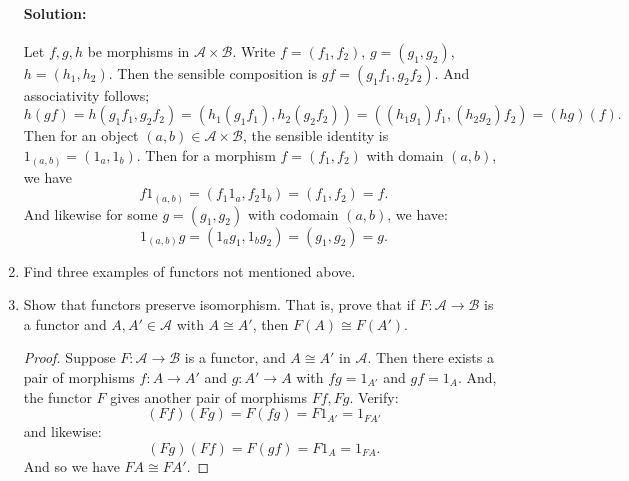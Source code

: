 \documentclass{article}
\begin{document}
\begin{enumerate}
         \paragraph{Solution: }Let $f,g,h$ be morphisms in $\mathscr{A}\times \mathscr{B}$.
         Write $f=(f_1,f_2)$, $g=(g_1,g_2)$, $h=(h_1,h_2)$. Then the sensible composition is $gf=(g_1f_1,g_2f_2)$. And associativity follows; 
         \[
         h(gf)=h(g_1f_1,g_2f_2)=(h_1(g_1f_1),h_2(g_2f_2))=((h_1g_1)f_1,(h_2g_2)f_2)=(hg)(f)
         .\] 
         Then for an object $(a,b)\in \mathscr{A}\times \mathscr{B}$, the sensible identity is $1_{(a,b)}=(1_a,1_b)$. Then for a morphism $f=(f_1,f_2)$ with domain $(a,b)$, we have 
         \[
         f1_{(a,b)}=(f_1 1_a, f_2 1_b)=(f_1,f_2)=f
         .\] 
         And likewise for some $g=(g_1,g_2)$ with codomain $(a,b)$, we have:
          \[
         1_{(a,b)}g=(1_ag_1,1_bg_2)=(g_1,g_2)=g
         .\] 
    \item Find three examples of functors not mentioned above.

    \item Show that functors preserve isomorphism. That is, prove that if $F:\mathscr{A}\to \mathscr{B}$ is a functor and $A,A'\in \mathscr{A}$ with $A\cong A'$, then $F(A)\cong F(A')$.
        \begin{proof} 
            Suppose $F:\mathscr{A}\to \mathscr{B} $ is a functor, and $A\cong A'$ in $\mathscr{A}.$ Then there exists a pair of morphisms $f:A\to A'$ and $g:A'\to A$ with $fg=1_{A'}$ and $gf=1_A$. And, the functor $F$ gives another pair of morphisms $Ff,Fg$. Verify:
            \[
            ( Ff)( Fg)= F(fg)=F1_{A'}=1_{FA'}
            \] 
            and likewise:
            \[
                (Fg)(Ff)=F(gf)=F 1_A=1_{FA}
            .\] 
            And so we have $FA\cong FA'$. 
        \end{proof}


\end{enumerate}
\end{document}
